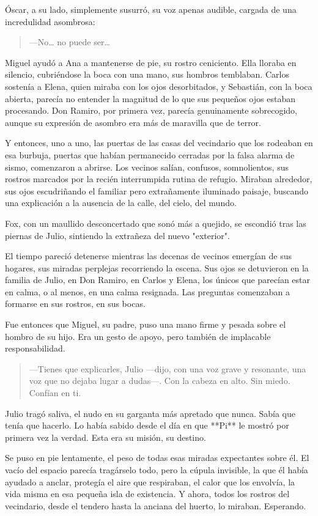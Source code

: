 \documentclass[a4paper,12pt]{book}
\begin{document}
Óscar, a su lado, simplemente susurró, su voz apenas audible, cargada de una incredulidad asombrosa:
\begin{quote}
    —No… no puede ser…
\end{quote}

Miguel ayudó a Ana a mantenerse de pie, su rostro ceniciento. Ella lloraba en silencio, cubriéndose la boca con una mano, sus hombros temblaban. Carlos sostenía a Elena, quien miraba con los ojos desorbitados, y Sebastián, con la boca abierta, parecía no entender la magnitud de lo que sus pequeños ojos estaban procesando. Don Ramiro, por primera vez, parecía genuinamente sobrecogido, aunque su expresión de asombro era más de maravilla que de terror.

Y entonces, uno a uno, las puertas de las casas del vecindario que los rodeaban en esa burbuja, puertas que habían permanecido cerradas por la falsa alarma de sismo, comenzaron a abrirse. Los vecinos salían, confusos, somnolientos, sus rostros marcados por la recién interrumpida rutina de refugio. Miraban alrededor, sus ojos escudriñando el familiar pero extrañamente iluminado paisaje, buscando una explicación a la ausencia de la calle, del cielo, del mundo.

Fox, con un maullido desconcertado que sonó más a quejido, se escondió tras las piernas de Julio, sintiendo la extrañeza del nuevo "exterior".

El tiempo pareció detenerse mientras las decenas de vecinos emergían de sus hogares, sus miradas perplejas recorriendo la escena. Sus ojos se detuvieron en la familia de Julio, en Don Ramiro, en Carlos y Elena, los únicos que parecían estar en calma, o al menos, en una calma resignada. Las preguntas comenzaban a formarse en sus rostros, en sus bocas.

Fue entonces que Miguel, su padre, puso una mano firme y pesada sobre el hombro de su hijo. Era un gesto de apoyo, pero también de implacable responsabilidad.
\begin{quote}
    —Tienes que explicarles, Julio —dijo, con una voz grave y resonante, una voz que no dejaba lugar a dudas—. Con la cabeza en alto. Sin miedo. Confían en ti.
\end{quote}

Julio tragó saliva, el nudo en su garganta más apretado que nunca. Sabía que tenía que hacerlo. Lo había sabido desde el día en que **Pi** le mostró por primera vez la verdad. Esta era su misión, su destino.

Se puso en pie lentamente, el peso de todas esas miradas expectantes sobre él. El vacío del espacio parecía tragárselo todo, pero la cúpula invisible, la que él había ayudado a anclar, protegía el aire que respiraban, el calor que los envolvía, la vida misma en esa pequeña isla de existencia. Y ahora, todos los rostros del vecindario, desde el tendero hasta la anciana del huerto, lo miraban. Esperando.
\end{document}
